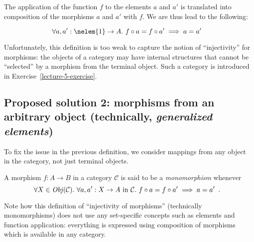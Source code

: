 The application of the function $f$ to the elements $a$ and $a'$ is translated
into composition of the morphisms $a$ and $a'$ with $f$.  We are thus lead to
the following:

\begin{equation*}
    \forall a, a' : \nelem{1} \rightarrow A.\ f \comp a = f \comp a'
    \implies a = a'
\end{equation*}

Unfortunately, this definition is too weak to capture the notion of
``injectivity'' for morphisms: the objects of a category may have internal
structures that cannot be ``selected'' by a morphism from the terminal
object.  Such a category is introduced in Exercise~\ref{lecture-5-exercise}.

\subsection{Proposed solution 2: morphisms from an arbitrary object
  (technically, \emph{generalized elements})}

To fix the issue in the previous definition, we consider mappings from any
object in the category, not just terminal objects.

\begin{definition}
A morphism $f: A\to B$ in a category $\mathcal C$ is said to be a
\emph{monomorphism} whenever
\begin{equation*}
    \forall X \in \operatorname{\mathit{Obj}}(\mathcal C).\
    \forall a, a' : X \rightarrow A \text{ in }\mathcal C.\
      f \circ a = f \circ a' \implies a = a'
    \enspace.
\end{equation*}
\end{definition}

Note how this definition of ``injectivity of morphisms'' (technically
monomorphisms) does not use any set-specific concepts such as elements and
function application: everything is expressed using composition of morphisms
which is available in any category.

